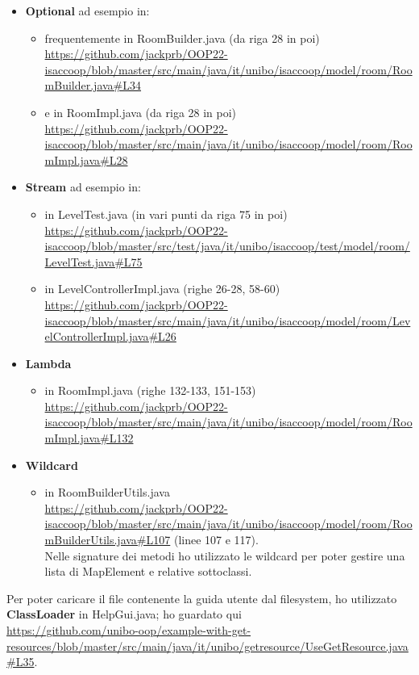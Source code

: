 \documentclass[a4paper,12pt]{report}
\begin{document}
\begin{itemize}
\item \textbf{Optional} ad esempio in:
    \begin{itemize}
        \item frequentemente in RoomBuilder.java (da riga 28 in poi) \url{https://github.com/jackprb/OOP22-isaccoop/blob/master/src/main/java/it/unibo/isaccoop/model/room/RoomBuilder.java#L34}
        \item e in RoomImpl.java (da riga 28 in poi) \url{https://github.com/jackprb/OOP22-isaccoop/blob/master/src/main/java/it/unibo/isaccoop/model/room/RoomImpl.java#L28}
    \end{itemize}
\item \textbf{Stream} ad esempio in: 
    \begin{itemize}
        \item in LevelTest.java (in vari punti da riga 75 in poi) \url{https://github.com/jackprb/OOP22-isaccoop/blob/master/src/test/java/it/unibo/isaccoop/test/model/room/LevelTest.java#L75}
        \item in LevelControllerImpl.java (righe 26-28, 58-60) \url{https://github.com/jackprb/OOP22-isaccoop/blob/master/src/main/java/it/unibo/isaccoop/model/room/LevelControllerImpl.java#L26}
    \end{itemize}
\item \textbf{Lambda}     
    \begin{itemize}
        \item in RoomImpl.java (righe 132-133, 151-153) \\\url{https://github.com/jackprb/OOP22-isaccoop/blob/master/src/main/java/it/unibo/isaccoop/model/room/RoomImpl.java#L132}
    \end{itemize}
\item \textbf{Wildcard} 
    \begin{itemize}
        \item in RoomBuilderUtils.java
    \\\url{https://github.com/jackprb/OOP22-isaccoop/blob/master/src/main/java/it/unibo/isaccoop/model/room/RoomBuilderUtils.java#L107}
    (linee 107 e 117). \\Nelle signature dei metodi ho utilizzato le wildcard per poter gestire una lista di MapElement e relative sottoclassi.
    \end{itemize}
\end{itemize}

Per poter caricare il file contenente la guida utente dal filesystem, ho utilizzato \textbf{ClassLoader} in HelpGui.java; ho guardato qui 
\\\url{https://github.com/unibo-oop/example-with-get-resources/blob/master/src/main/java/it/unibo/getresource/UseGetResource.java#L35}.
\end{document}
